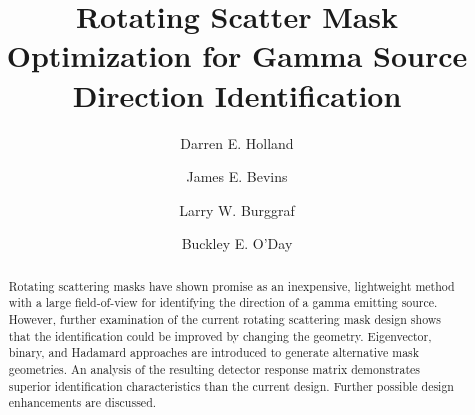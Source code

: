 \documentclass[3p,times]{elsarticle}
\begin{document}
\begin{frontmatter}



\dochead{}

\title{Rotating Scatter Mask Optimization for Gamma Source Direction Identification}


\author[d1]{Darren E. Holland}
\author[d2]{James E. Bevins}
\author[d3]{Larry W. Burggraf}
\author[d4]{Buckley E. O'Day}

\address[d1]{dholland@cedarville.edu\\
  Department of Mechanical Engineering\\
	Cedarville University \\
	Cedarville, OH\\}
	
\address[d2]{Department of Engineering Physics\\
	Air Force Institute of Technology \\
	Wright-Patterson AFB, OH\\}

\begin{abstract}
Rotating scattering masks have shown promise as an inexpensive, lightweight method with a large field-of-view for identifying the direction of a gamma emitting source.
However, further examination of the current rotating scattering mask design shows that the identification could be improved by changing the geometry.  
Eigenvector, binary, and Hadamard approaches are introduced to generate alternative mask geometries.  An analysis of the resulting detector response matrix demonstrates 
superior identification characteristics than the current design.  
Further possible design enhancements are discussed.
\end{abstract}


\end{frontmatter}
\end{document}

